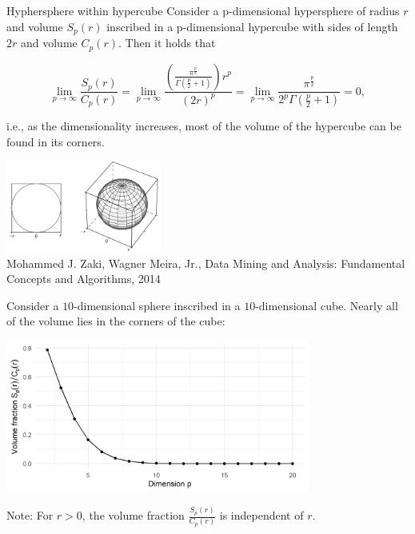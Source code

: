\documentclass[11pt,compress,t,notes=noshow, xcolor=table]{beamer}
\begin{document}
\begin{vbframe}{Hyphersphere within hypercube}
Consider a p-dimensional hypersphere of radius $r$ and volume $S_p(r)$ inscribed in a p-dimensional hypercube with sides of length $2r$ and volume $C_p(r)$. Then it holds that 
\begin{footnotesize}
$$\lim_{p\rightarrow \infty} \frac{S_p(r)}{C_p(r)} = \lim_{p\rightarrow \infty}
\frac{\left( \frac{\pi^{\frac{p}{2}}}{\Gamma(\frac{p}{2}+1)} \right)r^p}{(2r)^p} =
 \lim_{p\rightarrow \infty} \frac{\pi^{\frac{p}{2}}}{2^p\Gamma(\frac{p}{2}+1)} = 0,$$
\end{footnotesize}
i.e., as the dimensionality increases, most of the volume of the hypercube can be found in its corners.

\begin{center}
\includegraphics[height = 3cm, keepaspectratio]{figure_man/sphere_in_cube.png}\\
\scriptsize{Mohammed J. Zaki, Wagner Meira, Jr., Data Mining and Analysis: Fundamental Concepts and Algorithms, 2014}
\end{center}

\framebreak

Consider a $10$-dimensional sphere inscribed in a $10$-dimensional cube. Nearly all of the volume lies in the corners of the cube:
\medskip

\vspace*{0.1cm}
\begin{center}
\includegraphics[width = 10cm ]{figure/vol_dim_plot.png}
\end{center}

\begin{footnotesize}
Note: For $r > 0$, the volume fraction $\frac{S_p(r)}{C_p(r)}$ is independent of 
$r$.
\end{footnotesize}

\end{vbframe}
\end{document}
